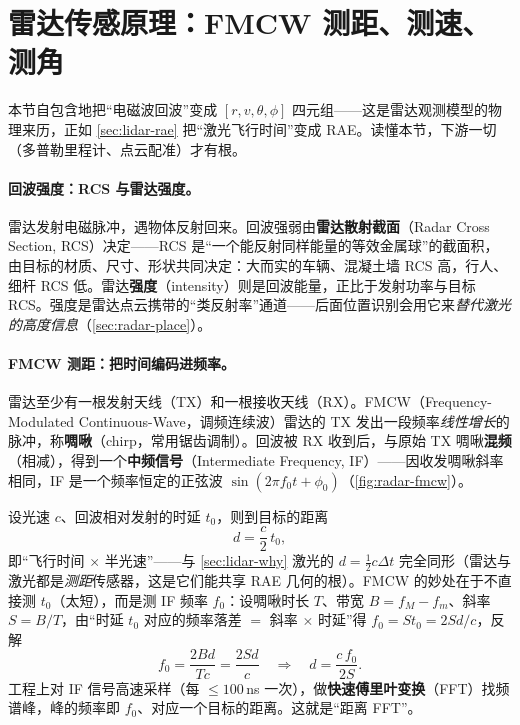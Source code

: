 \section{雷达传感原理：FMCW 测距、测速、测角}
\label{sec:radar-sensing}

本节自包含地把“电磁波回波”变成 $[r,v,\theta,\phi]$ 四元组——这是雷达观测模型的物理来历，正如 \cref{sec:lidar-rae} 把“激光飞行时间”变成 RAE。读懂本节，下游一切（多普勒里程计、点云配准）才有根。

\paragraph{回波强度：RCS 与雷达强度。}
雷达发射电磁脉冲，遇物体反射回来。回波强弱由\textbf{雷达散射截面}（Radar Cross Section, RCS）决定——RCS 是“一个能反射同样能量的等效金属球”的截面积，由目标的材质、尺寸、形状共同决定：大而实的车辆、混凝土墙 RCS 高，行人、细杆 RCS 低\cite{carlone2026handbook}。雷达\textbf{强度}（intensity）则是回波能量，正比于发射功率与目标 RCS。强度是雷达点云携带的“类反射率”通道——后面位置识别会用它来\emph{替代激光的高度信息}（\cref{sec:radar-place}）。

\paragraph{FMCW 测距：把时间编码进频率。}
雷达至少有一根发射天线（TX）和一根接收天线（RX）。FMCW（Frequency-Modulated Continuous-Wave，调频连续波）雷达的 TX 发出一段频率\emph{线性增长}的脉冲，称\textbf{啁啾}（chirp，常用锯齿调制）。回波被 RX 收到后，与原始 TX 啁啾\textbf{混频}（相减），得到一个\textbf{中频信号}（Intermediate Frequency, IF）——因收发啁啾斜率相同，IF 是一个频率恒定的正弦波 $\sin(2\pi f_0 t+\phi_0)$（\cref{fig:radar-fmcw}）\cite{carlone2026handbook}。

设光速 $c$、回波相对发射的时延 $t_0$，则到目标的距离
\begin{equation}
  d=\frac{c}{2}\,t_0,
  \label{eq:radar-tof}
\end{equation}
即“飞行时间 $\times$ 半光速”——与 \cref{sec:lidar-why} 激光的 $d=\tfrac12 c\Delta t$ 完全同形（雷达与激光都是\emph{测距}传感器，这是它们能共享 RAE 几何的根）。FMCW 的妙处在于不直接测 $t_0$（太短），而是测 IF 频率 $f_0$：设啁啾时长 $T$、带宽 $B=f_M-f_m$、斜率 $S=B/T$，由“时延 $t_0$ 对应的频率落差 $=$ 斜率 $\times$ 时延”得 $f_0=S t_0=2Sd/c$，反解
\begin{equation}
  f_0=\frac{2Bd}{Tc}=\frac{2Sd}{c}
  \quad\Longrightarrow\quad
  d=\frac{c\,f_0}{2S}.
  \label{eq:radar-range}
\end{equation}
工程上对 IF 信号高速采样（每 $\le100$\,ns 一次），做\textbf{快速傅里叶变换}（FFT）找频谱峰，峰的频率即 $f_0$、对应一个目标的距离。这就是“距离 FFT”。

